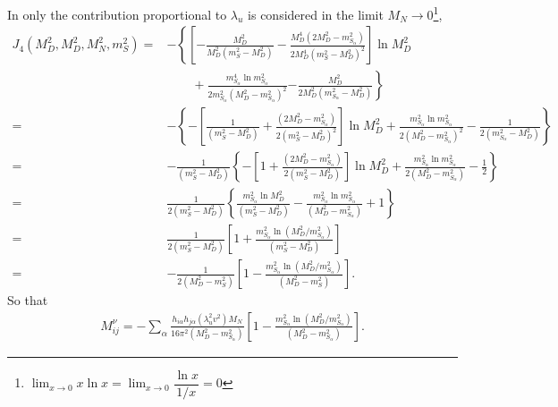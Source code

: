 In  \cite{Fraser:2014yha} only the contribution proportional to $\lambda_u$ is considered in the limit $M_N\to 0$\footnote{$\lim_{x\to 0}x\ln x=\lim_{x\to 0}\dfrac{\ln x}{1/x}=0$}, 
\begin{align*}
   J_4\left(M_D^2,M_D^2,M_N^2,m^2_{S}  \right)=&
-\left\{  \left[-\frac{M_D^2}{M_D^2\left(m_{S}^2-M_D^2\right)} 
-\frac{M_D^4 \left(2M_D^2-m_{S_\alpha}^2\right)}{2M_D^4\left(m_{S}^2-M_D^2\right)^2} \right]\ln M_D^2\right.\nonumber\\
&\qquad+\frac{m_{S_\alpha}^4\ln m_{S_\alpha}^2}{2m_{S_\alpha}^2\left( M_D^2-m_{S_\alpha}^2 \right)^2} 
\left.-\frac{M_D^2}{2M_D^2\left(m_{S_\alpha}^2-M_D^2  \right)} \right\}\nonumber\\
=&  -\left\{  -\left[\frac{1}{\left(m_{S}^2-M_D^2\right)} 
+\frac{\left(2M_D^2-m_{S_\alpha}^2\right)}{2\left(m_{S}^2-M_D^2\right)^2} \right]\ln M_D^2
+\frac{m_{S_\alpha}^2\ln m_{S_\alpha}^2}{2\left( M_D^2-m_{S_\alpha}^2 \right)^2} 
-\frac{1}{2\left(m_{S_\alpha}^2-M_D^2  \right)} \right\}\nonumber\\
=&  -\frac{1}{\left(m_{S}^2-M_D^2\right)}\left\{  -\left[1 
+\frac{\left(2M_D^2-m_{S_\alpha}^2\right)}{2\left(m_{S}^2-M_D^2\right)} \right]\ln M_D^2
+\frac{m_{S_\alpha}^2\ln m_{S_\alpha}^2}{2\left( M_D^2-m_{S_\alpha}^2 \right)} 
-\frac{1}{2} \right\}\nonumber\\
= & \frac{1}{2\left(m_{S}^2-M_D^2\right)}\left\{  \frac{m_{S_\alpha}^2\ln M_D^2}{\left(m_{S}^2-M_D^2\right)}
-\frac{m_{S_\alpha}^2\ln m_{S_\alpha}^2}{\left( M_D^2-m_{S_\alpha}^2 \right)} +1 \right\}\nonumber\\
=&  \frac{1}{2\left(m_{S}^2-M_D^2\right)}\left[ 1+ \frac{m_{S_\alpha}^2\ln \left( M_D^2/m_{S_\alpha}^2 \right)}{\left(m_{S}^2-M_D^2\right)}
\right]\nonumber\\
=& - \frac{1}{2\left(M_D^2-m_{S}^2\right)}\left[ 1-\frac{m_{S_\alpha}^2\ln \left( M_D^2/m_{S_\alpha}^2 \right)}{\left(M_D^2-m_{S}^2\right)}
\right].
\end{align*}
So that
\begin{align*}
M^{\nu}_{ij}=-\sum_{\alpha}\frac{h_{i\alpha}h_{j\alpha}\left(\lambda_u^2 v^2\right)M_N}{16\pi^2\left(M_D^2-m_{S_\alpha}^2\right)}
\left[ 1-\frac{m_{S_\alpha}^2\ln \left( M_D^2/m_{S_\alpha}^2 \right)}{\left(M_D^2-m_{S_\alpha}^2\right)}\right].
\end{align*}